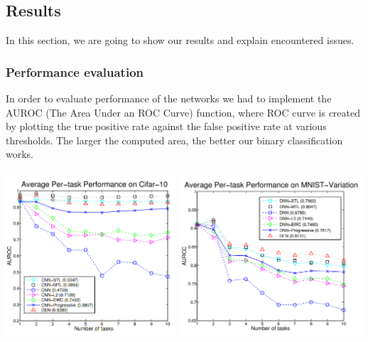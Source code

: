 \documentclass[12pt]{article}
\begin{document}
    \subsection {Results}

    In this section, we are going to show our results and explain encountered issues.

    \subsubsection{Performance evaluation}

    In order to evaluate performance of the networks we had to implement the AUROC (The Area Under an ROC
    Curve) function, where ROC curve is created by plotting the true positive rate against the false
    positive rate at various thresholds. The larger the computed area, the better our binary classification works. 
    \\
    \\
    \includegraphics[height=6cm]{paper-cifar-10.png}
    \includegraphics[height=6cm]{paper-mnist-var.png}
\end{document}
